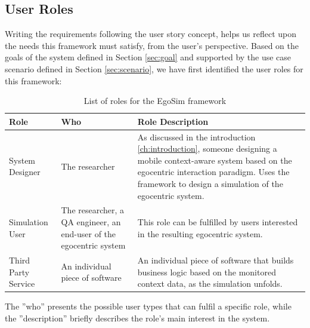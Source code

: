 \subsection{User Roles}\label{subsec:user_roles}
Writing the requirements following the user story concept, helps us reflect upon the needs this framework must satisfy, from the user's perspective. Based on the goals of the system defined in Section \ref{sec:goal} and supported by the use case scenario defined in Section \ref{sec:scenario}, we have first identified the user roles for this framework:
\begin{table}[H]
	\begin{center}
		\small \begin{tabular*}{1.1\columnwidth}{p{3cm}p{3cm}p{5.5cm}} 
			\\ \hline \hline
			Role & Who & Role Description \\ \hline \hline

		 	System Designer & The researcher & As discussed in the introduction \ref{ch:introduction}, someone designing a mobile context-aware system based on the egocentric interaction paradigm. Uses the framework to design a simulation of the egocentric system.\\ \hline

		 	Simulation User & The researcher, a QA engineer, an end-user of the egocentric system & This role can be fulfilled by users interested in the resulting egocentric system.\\ \hline

		 	Third Party Service & An individual piece of software & An individual piece of software that builds business logic based on the monitored context data, as the simulation unfolds.\\ \hline
		\end{tabular*}
		
		\caption{List of roles for the EgoSim framework}
		\label{table:roles}
	\end{center}
\end{table}
The ''who'' presents the possible user types that can fulfil a specific role, while the ''description'' briefly describes the role's main interest in the system.\\

